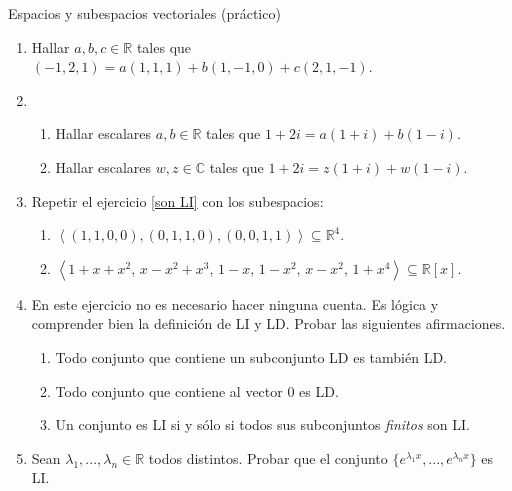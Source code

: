 \begin{chapter}{Espacios y subespacios vectoriales (práctico)}
\begin{enumerate}[resume, topsep=6pt, itemsep=.4cm]
\item  Hallar $a, b, c\in \mathbb{R}$ tales que $(-1,2,1)=a(1,1,1)+b(1,-1,0)+c(2,1,-1)$.


\item
\begin{enumerate}
    \item Hallar escalares $a, b \in \mathbb R$ tales que $1+2i=a(1+i)+b(1-i)$.
    \item  Hallar escalares $w, z \in \mathbb C$ tales que $1+2i=z(1+i)+w(1-i)$.
\end{enumerate}
%


\item  Repetir el ejercicio \ref{son LI} con los subespacios:

\begin{enumerate}
    \item ${\left\langle(1,1,0,0),(0,1,1,0),(0,0,1,1)\right\rangle}\subseteq \mathbb{R}^4$.
    \item ${\left\langle 1+x+x^2,\, x-x^2+x^3,\, 1-x,\, 1-x^2,\, x-x^2,\, 1+x^4\right\rangle}\subseteq \mathbb{R}[x]$.
\end{enumerate}


\item En este ejercicio no es necesario hacer ninguna cuenta. Es lógica y comprender bien la definición de LI y LD. Probar las siguientes afirmaciones.
\begin{enumerate}
\item Todo conjunto que contiene un subconjunto LD es también LD.
\item Todo conjunto que contiene al vector 0 es LD.
\item Un conjunto es LI si y sólo si todos sus subconjuntos \emph{finitos} son LI.
\end{enumerate}


\item Sean $\lambda_1, ..., \lambda_n\in\mathbb{R}$ todos distintos. Probar que el conjunto $\{e^{\lambda_1x}, ..., e^{\lambda_nx}\}$ es LI.



\end{enumerate}
\end{chapter}
